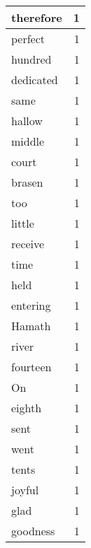 \begin{center}
\begin{longtable}{l|r}
therefore & 1 \\ \hline
perfect & 1 \\ \hline
hundred & 1 \\ \hline
dedicated & 1 \\ \hline
same & 1 \\ \hline
hallow & 1 \\ \hline
middle & 1 \\ \hline
court & 1 \\ \hline
brasen & 1 \\ \hline
too & 1 \\ \hline
little & 1 \\ \hline
receive & 1 \\ \hline
time & 1 \\ \hline
held & 1 \\ \hline
entering & 1 \\ \hline
Hamath & 1 \\ \hline
river & 1 \\ \hline
fourteen & 1 \\ \hline
On & 1 \\ \hline
eighth & 1 \\ \hline
sent & 1 \\ \hline
went & 1 \\ \hline
tents & 1 \\ \hline
joyful & 1 \\ \hline
glad & 1 \\ \hline
goodness & 1 \\ \hline
\end{longtable}
\end{center}



\normalsize



